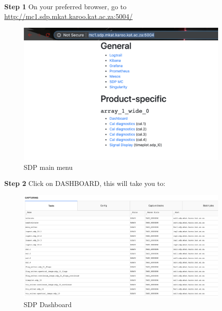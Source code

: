 \begin{itemize}
\item[\textbf{Step 1}] On your preferred browser, go to \url{http://mc1.sdp.mkat.karoo.kat.ac.za:5004/}
\begin{figure}[!thb]
	\centering
	\includegraphics[scale=0.23]{Chapters/images/image96.png}
	
	\caption{SDP main menu}
	\label{fig:image96}
\end{figure}


\item[\textbf{Step 2}] Click on DASHBOARD,  this will take you to:


\begin{figure}[!thb]
	\centering
	\includegraphics[scale=0.23]{Chapters/images/image16.png}
	
	\caption{SDP Dashboard}
	\label{fig:image16}
\end{figure}


\end{itemize}

